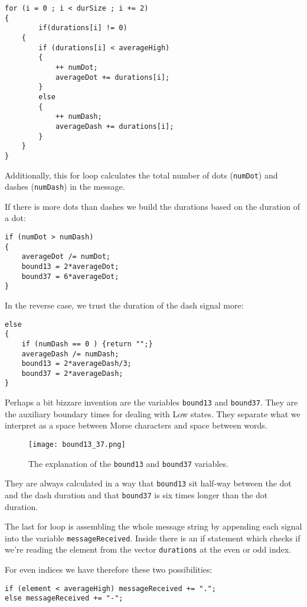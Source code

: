 \documentclass[12pt]{report}
\begin{document}
\begin{lstlisting}
for (i = 0 ; i < durSize ; i += 2)
{
     	if(durations[i] != 0)
	{
		if (durations[i] < averageHigh)
		{
			++ numDot;
			averageDot += durations[i];
		}
		else
		{
			++ numDash;
			averageDash += durations[i];
		}
	}
}
\end{lstlisting}

Additionally, this for loop calculates the total number of dots (\texttt{numDot}) and dashes (\texttt{numDash}) in the message.

\newpage

If there is more dots than dashes we build the durations based on the duration of a dot:

\begin{lstlisting}
if (numDot > numDash)
{
	averageDot /= numDot;
	bound13 = 2*averageDot;
	bound37 = 6*averageDot;
}
\end{lstlisting}

In the reverse case, we trust the duration of the dash signal more:

\begin{lstlisting}
else
{
	if (numDash == 0 ) {return "";}
	averageDash /= numDash;
	bound13 = 2*averageDash/3;
	bound37 = 2*averageDash;
}
\end{lstlisting}

Perhaps a bit bizzare invention are the variables \texttt{bound13} and \texttt{bound37}. They are the auxiliary boundary times for dealing with Low states. They separate what we interpret as a space between Morse characters and space between words.


\begin{figure}[H]
\centering\texttt{[image: bound13\_37.png]}
\caption{The explanation of the \texttt{bound13} and \texttt{bound37} variables.}				
\label{fig:bound}
\end{figure}

They are always calculated in a way that \texttt{bound13} sit half-way between the dot and the dash duration and that \texttt{bound37} is six times longer than the dot duration.

The last for loop is assembling the whole message string by appending each signal into the variable \texttt{messageReceived}. Inside there is an if statement which checks if we're reading the element from the vector \texttt{durations} at the even or odd index.

For even indices we have therefore these two possibilities:

\begin{lstlisting}
if (element < averageHigh) messageReceived += ".";
else messageReceived += "-";
\end{lstlisting}
\end{document}
